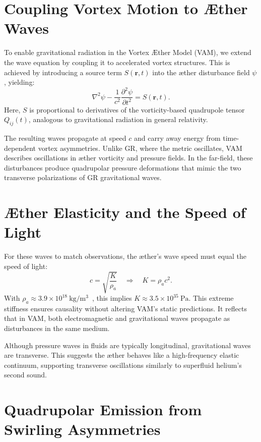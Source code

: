 \section*{Coupling Vortex Motion to Æther Waves}

To enable gravitational radiation in the Vortex Æther Model (VAM), we extend the wave equation by coupling it to accelerated vortex structures. This is achieved by introducing a source term $S(\mathbf{r}, t)$ into the æther disturbance field $\psi$, yielding:
\begin{equation}
\nabla^2 \psi - \frac{1}{c^2} \frac{\partial^2 \psi}{\partial t^2} = S(\mathbf{r}, t).
\end{equation}
Here, $S$ is proportional to derivatives of the vorticity-based quadrupole tensor $Q_{ij}(t)$, analogous to gravitational radiation in general relativity.

The resulting waves propagate at speed $c$ and carry away energy from time-dependent vortex asymmetries. Unlike GR, where the metric oscillates, VAM describes oscillations in æther vorticity and pressure fields. In the far-field, these disturbances produce quadrupolar pressure deformations that mimic the two transverse polarizations of GR gravitational waves.

\section*{Æther Elasticity and the Speed of Light}

For these waves to match observations, the æther's wave speed must equal the speed of light:
\begin{equation}
c = \sqrt{\frac{K}{\rho_a}} \quad \Rightarrow \quad K = \rho_a c^2.
\end{equation}
With $\rho_a \approx 3.9 \times 10^{18}~\mathrm{kg/m^3}$~\cite{iskandarani2025VAM2}, this implies $K \approx 3.5 \times 10^{35}~\mathrm{Pa}$. This extreme stiffness ensures causality without altering VAM's static predictions. It reflects that in VAM, both electromagnetic and gravitational waves propagate as disturbances in the same medium.

Although pressure waves in fluids are typically longitudinal, gravitational waves are transverse. This suggests the æther behaves like a high-frequency elastic continuum, supporting transverse oscillations similarly to superfluid helium's second sound.

\section*{Quadrupolar Emission from Swirling Asymmetries}

